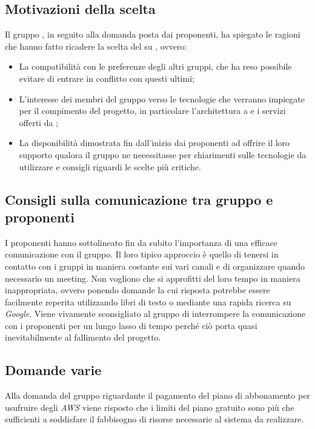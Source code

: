 \subsection{Motivazioni della scelta}
Il gruppo {\Gruppo}, in seguito alla domanda posta dai proponenti, ha spiegato le ragioni che hanno fatto ricadere la scelta del  su {\NomeProgetto}, ovvero:
\begin{itemize}
	\item La compatibilità con le preferenze degli altri gruppi, che ha reso possibile evitare di entrare in conflitto con questi ultimi;
	\item L'interesse dei membri del gruppo verso le tecnologie che verranno impiegate per il compimento del progetto, in particolare l'architettura a  e i servizi offerti da ;
	\item La disponibilità dimostrata fin dall'inizio dai proponenti ad offrire il loro supporto qualora il gruppo ne necessitasse per chiarimenti sulle tecnologie da utilizzare e consigli riguardi le scelte più critiche.
\end{itemize}

\subsection{Consigli sulla comunicazione tra gruppo e proponenti}
I proponenti hanno sottolineato fin da subito l'importanza di una efficace comunicazione con il gruppo. Il loro tipico approccio è quello di tenersi in contatto con i gruppi in maniera costante sui vari canali  e di organizzare quando necessario un meeting.
Non vogliono che si approfitti del loro tempo in maniera inappropriata, ovvero ponendo domande la cui risposta potrebbe essere facilmente reperita utilizzando libri di testo o mediante una rapida ricerca su \textit{Google}.
Viene vivamente sconsigliato al gruppo di interrompere la comunicazione con i proponenti per un lungo lasso di tempo perché ciò porta quasi inevitabilmente al fallimento del progetto.

\subsection{Domande varie}
Alla domanda del gruppo riguardante il pagamento del piano di abbonamento per usufruire degli \textit{AWS} viene risposto che i limiti del piano gratuito sono più che sufficienti a soddisfare il fabbisogno di risorse necessarie al sistema da realizzare.

